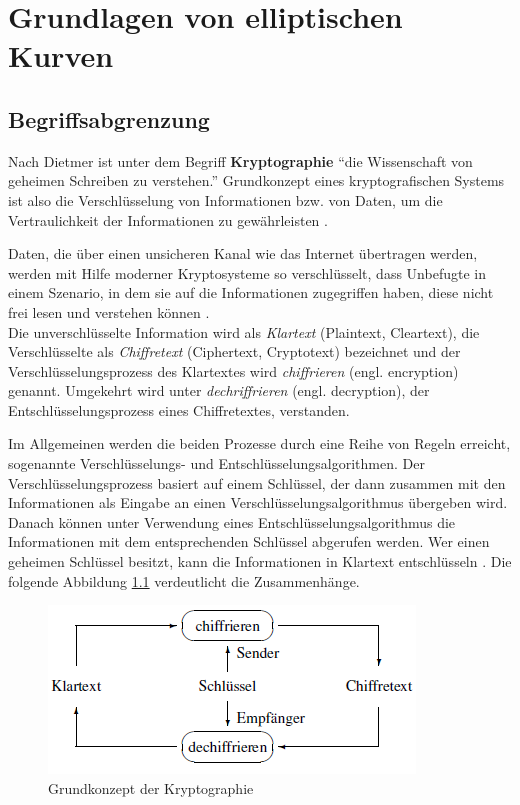 \chapter{Grundlagen von elliptischen Kurven}

\section{Begriffsabgrenzung}


Nach Dietmer ist unter dem Begriff  \textbf{Kryptographie} \enquote{die Wissenschaft von geheimen Schreiben zu verstehen.} Grundkonzept eines kryptografischen Systems ist also die Verschlüsselung von Informationen bzw. von Daten, um die Vertraulichkeit der Informationen zu gewährleisten \cite{damer}.

Daten, die über einen unsicheren Kanal wie das Internet übertragen werden, werden mit Hilfe moderner Kryptosysteme so verschlüsselt, dass Unbefugte in einem Szenario, in dem sie auf die Informationen zugegriffen haben, diese nicht frei lesen und verstehen können \cite{moVarol}. \\
Die unverschlüsselte Information wird als \textit{Klartext} (Plaintext, Cleartext), die Verschlüsselte als \textit{Chiffretext} (Ciphertext, Cryptotext) bezeichnet und der Verschlüsselungsprozess des Klartextes wird \textit{chiffrieren} (engl. encryption) genannt. Umgekehrt wird unter \textit{dechriffrieren} (engl. decryption), der Entschlüsselungsprozess eines Chiffretextes, verstanden.

Im Allgemeinen werden die beiden Prozesse durch eine Reihe von Regeln erreicht, sogenannte Verschlüsselungs- und Entschlüsselungsalgorithmen. Der Verschlüsselungsprozess basiert auf einem Schlüssel, der dann zusammen mit den Informationen als Eingabe an einen Verschlüsselungsalgorithmus übergeben wird. 
Danach können unter Verwendung eines Entschlüsselungsalgorithmus die Informationen mit dem entsprechenden Schlüssel abgerufen werden. Wer einen geheimen Schlüssel besitzt, kann die Informationen in Klartext entschlüsseln \cite{moVarol}. Die folgende Abbildung \ref{konzept} verdeutlicht die Zusammenhänge.

\begin{figure}
    \centering
    \includegraphics[width = 0.5 \textwidth]{Graphics/Cipher.png}
    \caption{Grundkonzept der Kryptographie}
    \label{konzept}
\end{figure}


